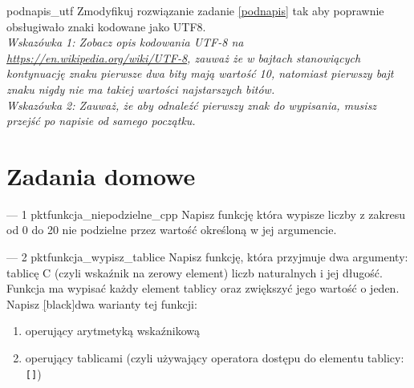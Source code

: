 \documentclass{pdfBooklets}
\begin{document}
\begin{Zadanie}{}{podnapis_utf}
Zmodyfikuj rozwiązanie zadanie \ref{podnapis} tak aby poprawnie obsługiwało znaki kodowane jako UTF8.
\\ \textit{
	Wskazówka 1: Zobacz opis kodowania UTF-8 na \url{https://en.wikipedia.org/wiki/UTF-8},
	zauważ że w bajtach stanowiących kontynuację znaku pierwsze dwa bity mają wartość 10,
	natomiast pierwszy bajt znaku nigdy nie ma takiej wartości najstarszych bitów.}
\\ \textit{
	Wskazówka 2: Zauważ, że aby odnaleźć pierwszy znak do wypisania, musisz przejść po napisie od samego początku.}
\end{Zadanie}

\student{\clearpage}
\section{Zadania domowe}
\vspace{3pt}

\begin{Zadanie}{ --- 1 pkt}{funkcja_niepodzielne_cpp}
Napisz funkcję która wypisze liczby z zakresu od 0 do 20 nie podzielne przez wartość określoną w jej argumencie.
\end{Zadanie}

\begin{Zadanie}{ --- 2 pkt}{funkcja_wypisz_tablice}
Napisz funkcję, która przyjmuje dwa argumenty: tablicę C (czyli wskaźnik na zerowy element) liczb naturalnych i jej długość.
Funkcja ma wypisać każdy element tablicy oraz zwiększyć jego wartość o jeden.
Napisz \ul[black]{dwa warianty} tej funkcji:
\begin{enumerate}[label=\alph*)]
\item operujący arytmetyką wskaźnikową
\item operujący tablicami (czyli używający operatora dostępu do elementu tablicy: \Verb#[]#)
\end{enumerate}
\end{Zadanie}


\end{document}
